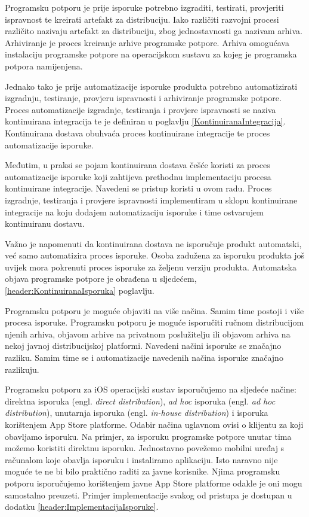 \documentclass[times, utf8, diplomski, numeric]{fer}
\newcommand{\eng}[1]{(engl. \textit{#1})}
\begin{document}
Programsku potporu je prije isporuke potrebno izgraditi, testirati, provjeriti ispravnost te kreirati artefakt za distribuciju. Iako različiti razvojni procesi različito nazivaju artefakt za distribuciju, zbog jednostavnosti ga nazivam arhiva. Arhiviranje je proces kreiranje arhive programske potpore. Arhiva omogućava instalaciju programske potpore na operacijskom sustavu za kojeg je programska potpora namijenjena.

Jednako tako je prije automatizacije isporuke produkta potrebno automatizirati izgradnju, testiranje, provjeru ispravnosti i arhiviranje programske potpore. Proces automatizacije izgradnje, testiranja i provjere ispravnosti se naziva kontinuirana integracija te je definiran u poglavlju \ref{KontinuiranaIntegracija}. Kontinuirana dostava obuhvaća proces kontinuirane integracije te proces automatizacije isporuke.

Međutim, u praksi se pojam kontinuirana dostava češće koristi za proces automatizacije isporuke koji zahtijeva prethodnu implementaciju procesa kontinuirane integracije. Navedeni se pristup koristi u ovom radu. Proces izgradnje, testiranja i provjere ispravnosti implementiram u sklopu kontinuirane integracije na koju dodajem automatizaciju isporuke i time ostvarujem kontinuiranu dostavu.

Važno je napomenuti da kontinuirana dostava ne isporučuje produkt automatski, već samo automatizira proces isporuke. Osoba zadužena za isporuku produkta još uvijek mora pokrenuti proces isporuke za željenu verziju produkta. Automatska objava programske potpore je obrađena u sljedećem, \ref{header:KontinuiranaIsporuka} poglavlju.

Programsku potporu je moguće objaviti na više načina. Samim time postoji i više procesa isporuke. Programsku potporu je moguće isporučiti ručnom distribucijom njenih arhiva, objavom arhive na privatnom poslužitelju ili objavom arhiva na nekoj javnoj distribucijskoj platformi. Navedeni načini isporuke se značajno razliku. Samim time se i automatizacije navedenih načina isporuke značajno razlikuju.

Programsku potporu za iOS operacijski sustav isporučujemo na sljedeće načine: direktna isporuka \eng{direct distribution}, \textit{ad hoc} isporuka \eng{ad hoc distribution}, unutarnja isporuka \eng{in-house distribution} i isporuka korištenjem App Store platforme. Odabir načina uglavnom ovisi o klijentu za koji obavljamo isporuku. Na primjer, za isporuku programske potpore unutar tima možemo koristiti direktnu isporuku. Jednostavno povežemo mobilni uređaj s računalom koje obavlja isporuku i instaliramo aplikaciju. Isto naravno nije moguće te ne bi bilo praktično raditi za javne korisnike. Njima programsku potporu isporučujemo korištenjem javne App Store platforme odakle je oni mogu samostalno preuzeti. Primjer implementacije svakog od pristupa je dostupan u dodatku \ref{header:ImplementacijaIsporuke}.
\end{document}
